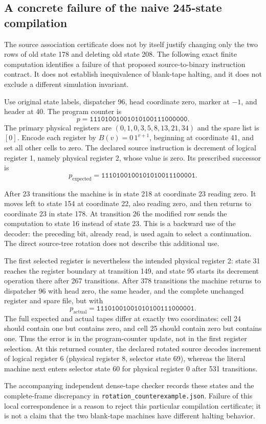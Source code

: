 \subsection{A concrete failure of the naive 245-state compilation}
The source association certificate does not by itself justify changing only
the two rows of old state 178 and deleting old state 208.  The following exact
finite computation identifies a failure of that proposed source-to-binary
instruction contract.  It does not establish inequivalence of blank-tape
halting, and it does not exclude a different simulation invariant.

Use original state labels, dispatcher 96, head coordinate zero, marker at
$-1$, and header at 40.  The program counter is
\[
 p=\mathtt{11101001001010100111000000}.
\]
The primary physical registers are $(0,1,0,3,5,8,13,21,34)$ and the spare list
is $[0]$.  Encode each register by $B(v)=0\,1^{v+1}$, beginning at coordinate
41, and set all other cells to zero.  The declared source instruction is
decrement of logical register 1, namely physical register 2, whose value is
zero.  Its prescribed successor is
\[
 p_{\mathrm{expected}}=\mathtt{1110100100101010011100001}.
\]

After 23 transitions the machine is in state 218 at coordinate 23 reading
zero.  It moves left to state 154 at coordinate 22, also reading zero, and
then returns to coordinate 23 in state 178.  At transition 26 the modified
row sends the computation to state 16 instead of state 23.  This is a
backward use of the decoder: the preceding bit, already read, is used again
to select a continuation.  The direct source-tree rotation does not describe
this additional use.

The first selected register is nevertheless the intended physical register
2: state 31 reaches the register boundary at transition 149, and state 95
starts its decrement operation there after 267 transitions.  After 378
transitions the machine returns to dispatcher 96 with head zero, the same
header, and the complete unchanged register and spare file, but with
\[
 p_{\mathrm{actual}}=\mathtt{11101001001010100111000001}.
\]
The full expected and actual tapes differ at exactly two coordinates: cell
24 should contain one but contains zero, and cell 25 should contain zero but
contains one.  Thus the error is in the program-counter update, not in the
first register selection.  At this returned counter, the declared rotated
source decodes increment of logical register 6 (physical register 8, selector
state 69), whereas the literal machine next enters selector state 60 for
physical register 0 after 531 transitions.

The accompanying independent dense-tape checker records these states and
the complete-frame discrepancy in \texttt{rotation\_counterexample.json}.
Failure of this local correspondence is a reason to reject this particular
compilation certificate; it is not a claim that the two blank-tape machines
have different halting behavior.
